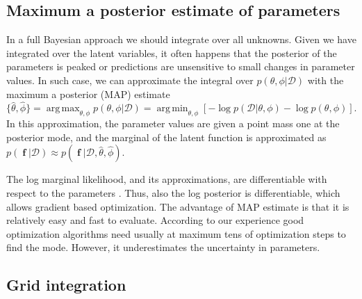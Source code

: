 \documentclass[twoside,11pt]{article}
\DeclareMathOperator{\f}{\mathbf{f}}
\DeclareMathOperator*{\argmax}{arg\,max}
\DeclareMathOperator*{\argmin}{arg\,min}
\begin{document}
\subsection{Maximum a posterior estimate of parameters}

In a full Bayesian approach we should integrate over all unknowns.
Given we have integrated over the latent variables, it often happens
that the posterior of the parameters is peaked or predictions are
unsensitive to small changes in parameter values.  In such case, we can
approximate the integral over $p(\theta,\phi|\mathcal{D})$ with the
maximum a posterior (MAP) estimate
%
\begin{equation}
\{\hat{\theta}, \hat{\phi}\} = \argmax_{\theta,\phi}
p(\theta,\phi|\mathcal{D}) = \argmin_{\theta,\phi}
\left[ -\log p(\mathcal{D}|\theta,\phi) - \log p(\theta,\phi) \right].
\end{equation}
%
In this approximation, the parameter values are given a point mass one
at the posterior mode, and the marginal of the latent function is
approximated as $p(\f|\mathcal{D}) \approx p(\f|\mathcal{D},
\hat{\theta}, \hat{\phi})$.

The log marginal likelihood, and its approximations, are
differentiable with respect to the parameters
\citep{Seeger:2005,Rasmussen+Williams:2006}. Thus, also the log
posterior is differentiable, which allows gradient based optimization.
The advantage of MAP estimate is that it is relatively easy and fast
to evaluate. According to our experience good optimization algorithms
need usually at maximum tens of optimization steps to find the
mode. However, it underestimates the uncertainty in parameters.

\subsection{Grid integration}\label{sec_grid_integration}
\end{document}
